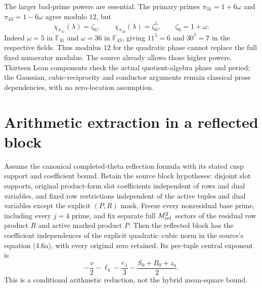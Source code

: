 The larger bad-prime powers are essential. The primary primes
$\pi_{31}=1+6\omega$ and $\pi_{43}=1-6\omega$ agree modulo $12$, but
\[
 \chi_{\pi_{31}}(\lambda)=\zeta_6,\qquad
 \chi_{\pi_{43}}(\lambda)=\zeta_6^5,\qquad \zeta_6=1+\omega.
\]
Indeed $\omega=5$ in $\mathbb F_{31}$ and $\omega=36$ in
$\mathbb F_{43}$, giving $11^5=6$ and $30^7=7$ in the respective fields.
Thus modulus $12$ for the quadratic phase cannot replace the full fixed
numerator modulus. The source already allows those higher powers.
Thirteen Lean components check the actual quotient-algebra phase and period;
the Gaussian, cubic-reciprocity and conductor arguments remain classical
prose dependencies, with no zero-location assumption.

\section{Arithmetic extraction in a reflected block}
\begin{proposition}\label{prop:reflected-extraction}
Assume the canonical completed-theta reflection formula with its stated
cusp support and coefficient bound. Retain the source block hypotheses:
disjoint slot supports, original product-form slot coefficients independent
of rows and dual variables, and fixed row restrictions independent of the
active tuples and dual variables except the explicit $(P,R)$ mask.
Freeze every nonresidual base prime,
including every $j=4$ prime, and fix separate full $M_{\rm ref}^2$
sectors of the residual row product $R$ and active marked product $P$.
Then the reflected block has the coefficient independences of the explicit
quadratic--cubic norm in the source's equation (4.6a), with every original
zero retained. Its per-tuple central exponent is
\[
 -\frac v2-\ell_b-\frac{e_\lambda}3
       -\frac{S_0+B_0+z_a}2.
\]
This is a conditional arithmetic reduction, not the hybrid mean-square bound.
\end{proposition}
